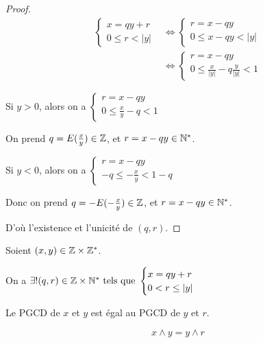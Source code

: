 \documentclass[12pt, a4paper]{report}
\begin{document}
\begin{proof}
    \begin{align*}
        \begin{cases}
            x = qy + r\\
            0 \leq r < |y|
        \end{cases} &\iff \begin{cases}
        r = x-qy\\
        0 \le x - qy < |y|
        \end{cases}\\
        &\iff \begin{cases}
        r = x - qy\\
        0 \le \frac{x}{|y|} - q \frac{y}{|y|} < 1
        \end{cases}
    \end{align*}

    Si $y > 0$, alors on a $\begin{cases}
    r = x-qy\\
    0 \le \frac{x}{y} - q < 1
    \end{cases}$

    On prend $q=E(\frac{x}{y}) \in \mathbb{Z}$, et $r = x-qy \in \mathbb{N}^*$.

    Si $y < 0$, alors on a $\begin{cases}
    r = x-qy\\
    -q \le -\frac{x}y < 1 - q
    \end{cases}$

    Donc on prend $q = -E(-\frac{x}{y}) \in \mathbb{Z}$, et $r = x-qy \in \mathbb{N}^*$.

    D'où l'existence et l'unicité de $(q,r)$.
\end{proof}

\begin{property}
    Soient $(x,y) \in \mathbb{Z} \times\mathbb{Z}^*$.

    On a $\exists!(q,r)\in\mathbb{Z}\times\mathbb{N}^* \text{ tels que } \begin{cases}
    x=qy+r\\
    0 < r \leq |y|
    \end{cases}$

    Le PGCD de $x$ et $y$ est égal au PGCD de $y$ et $r$.

    $$x\wedge y = y \wedge r$$
\end{property}
\end{document}
